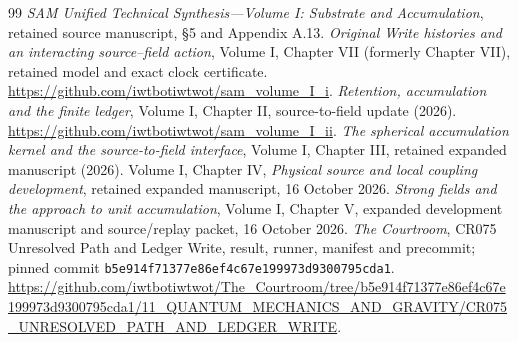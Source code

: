 \begin{thebibliography}{99}
\small
{} \emph{SAM Unified Technical Synthesis---Volume I: Substrate and Accumulation}, retained source manuscript, \S5 and Appendix A.13.
 \emph{Original Write histories and an interacting source--field action}, Volume I, Chapter VII (formerly Chapter VII), retained model and exact clock certificate. \url{https://github.com/iwtbotiwtwot/sam_volume_I_i}.
 \emph{Retention, accumulation and the finite ledger}, Volume I, Chapter II, source-to-field update (2026). \url{https://github.com/iwtbotiwtwot/sam_volume_I_ii}.
 \emph{The spherical accumulation kernel and the source-to-field interface}, Volume I, Chapter III, retained expanded manuscript (2026).
 Volume I, Chapter IV, \emph{Physical source and local coupling development}, retained expanded manuscript, 16 October 2026.
 \emph{Strong fields and the approach to unit accumulation}, Volume I, Chapter V, expanded development manuscript and source/replay packet, 16 October 2026.
 \emph{The Courtroom}, CR075 Unresolved Path and Ledger Write, result, runner, manifest and precommit; pinned commit \nolinkurl{b5e914f71377e86ef4c67e199973d9300795cda1}. \url{https://github.com/iwtbotiwtwot/The_Courtroom/tree/b5e914f71377e86ef4c67e199973d9300795cda1/11_QUANTUM_MECHANICS_AND_GRAVITY/CR075_UNRESOLVED_PATH_AND_LEDGER_WRITE}.


\end{thebibliography}

